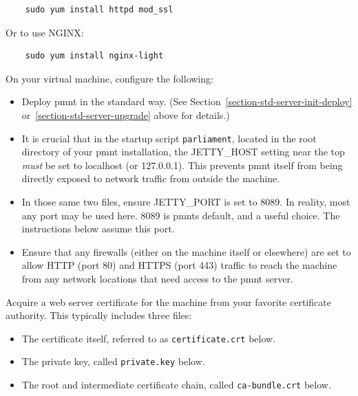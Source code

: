 \begin{Verbatim}
	sudo yum install httpd mod_ssl
\end{Verbatim}

Or to use NGINX:

\begin{Verbatim}
	sudo yum install nginx-light
\end{Verbatim}

On your virtual machine, configure the following:

\begin{itemize}
	\item Deploy \ac{pmnt} in the standard way.  (See Section~\ref{section-std-server-init-deploy} or~\ref{section-std-server-upgrade} above for details.)

	\item It is crucial that in the startup script \texttt{parliament}, located in the root directory of your \ac{pmnt} installation, the JETTY\_HOST setting near the top \emph{must} be set to localhost (or 127.0.0.1).  This prevents \ac{pmnt} itself from being directly exposed to network traffic from outside the machine.

	\item In those same two files, ensure JETTY\_PORT is set to 8089.  In reality, most any port may be used here.  8089 is \acp{pmnt} default, and a useful choice.  The instructions below assume this port.

	\item Ensure that any firewalls (either on the machine itself or elsewhere) are set to allow HTTP (port 80) and HTTPS (port 443) traffic to reach the machine from any network locations that need access to the \ac{pmnt} server.
\end{itemize}

Acquire a web server certificate for the machine from your favorite certificate authority.  This typically includes three files:

\begin{itemize}
	\item The certificate itself, referred to as \texttt{certificate.crt} below.

	\item The private key, called \texttt{private.key} below.

	\item The root and intermediate certificate chain, called \texttt{ca-bundle.crt} below.
\end{itemize}



